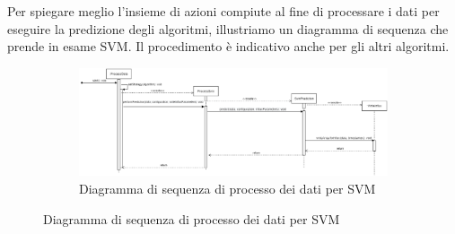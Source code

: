 Per spiegare meglio l'insieme di azioni compiute al fine di processare i dati per eseguire la predizione degli algoritmi, illustriamo un diagramma di sequenza che prende in esame SVM\glo. Il procedimento è indicativo anche per gli altri algoritmi.
\mbox{}
\begin{landscape}
	\begin{figure}
		\begin{figure} [H]
			\includegraphics[width=\linewidth]{./img/Diagrammi/ds-plug-in.png}
			\caption{Diagramma di sequenza di processo dei dati per SVM}
		\end{figure}
	\end{figure}
\end{landscape}